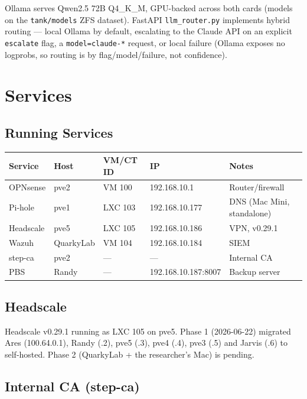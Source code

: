 \documentclass[11pt,letterpaper]{article}
\begin{document}
Ollama serves Qwen2.5 72B Q4\_K\_M, GPU-backed across both cards (models on the
\texttt{tank/models} ZFS dataset). FastAPI \texttt{llm\_router.py} implements hybrid
routing — local Ollama by default, escalating to the Claude API on an explicit
\texttt{escalate} flag, a \texttt{model=claude-*} request, or local failure (Ollama
exposes no logprobs, so routing is by flag/model/failure, not confidence).

\section{Services}

\subsection{Running Services}

\begin{tabular}{lllll}
\toprule
\textbf{Service} & \textbf{Host} & \textbf{VM/CT ID} & \textbf{IP} & \textbf{Notes} \\
\midrule
OPNsense   & pve2      & VM 100  & 192.168.10.1    & Router/firewall \\
Pi-hole    & pve1      & LXC 103 & 192.168.10.177  & DNS (Mac Mini, standalone) \\
Headscale  & pve5      & LXC 105 & 192.168.10.186  & VPN, v0.29.1 \\
Wazuh      & QuarkyLab & VM 104  & 192.168.10.184  & SIEM \\
step-ca    & pve2      & —       & —               & Internal CA \\
PBS        & Randy     & —       & 192.168.10.187:8007 & Backup server \\
\bottomrule
\end{tabular}

\subsection{Headscale}

Headscale v0.29.1 running as LXC 105 on pve5. Phase 1 (2026-06-22) migrated
Ares (100.64.0.1), Randy (.2), pve5 (.3), pve4 (.4), pve3 (.5) and Jarvis (.6)
to self-hosted. Phase 2 (QuarkyLab + the researcher's Mac) is pending.

\subsection{Internal CA (step-ca)}
\end{document}
